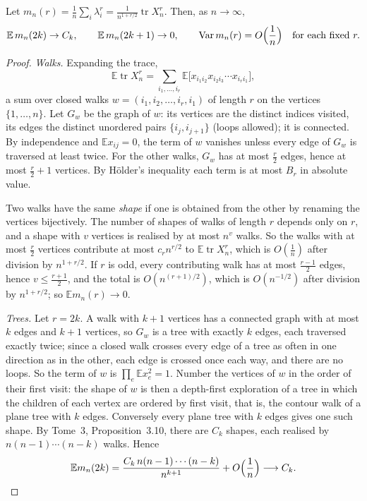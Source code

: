 \begin{lemma}\label{lem:walks}
Let $m_n(r)=\frac1n\sum_i\lambda_i^r=\frac1{n^{1+r/2}}\operatorname{tr}X_n^r$. Then, as $n\to\infty$,
\[
\mathbb E\,m_n(2k)\to C_k,\qquad\mathbb E\,m_n(2k+1)\to0,\qquad\operatorname{Var}m_n(r)=O\Bigl(\frac1n\Bigr)\quad\text{for each fixed }r.
\]
\end{lemma}
\begin{proof}
\emph{Walks.} Expanding the trace,
\[
\mathbb E\operatorname{tr}X_n^r=\sum_{i_1,\dots,i_r}\mathbb E\bigl[x_{i_1i_2}x_{i_2i_3}\cdots x_{i_ri_1}\bigr],
\]
a sum over closed walks $w=(i_1,i_2,\dots,i_r,i_1)$ of length $r$ on the vertices $\{1,\dots,n\}$. Let $G_w$ be the graph of $w$: its vertices are the
distinct indices visited, its edges the distinct unordered pairs $\{i_j,i_{j+1}\}$ (loops allowed); it is connected. By independence and $\mathbb Ex_{ij}=0$,
the term of $w$ vanishes unless every edge of $G_w$ is traversed at least twice. For the other walks, $G_w$ has at most $\frac r2$ edges, hence at most
$\frac r2+1$ vertices. By H\"older's inequality each term is at most $B_r$ in absolute value.

Two walks have the same \emph{shape} if one is obtained from the other by renaming the vertices bijectively. The number of shapes of walks of length $r$
depends only on $r$, and a shape with $v$ vertices is realised by at most $n^v$ walks. So the walks with at most $\frac r2$ vertices contribute at most
$c_rn^{r/2}$ to $\mathbb E\operatorname{tr}X_n^r$, which is $O(\frac1n)$ after division by $n^{1+r/2}$. If $r$ is odd, every contributing walk has at most $\frac{r-1}2$ edges, hence $v\le\frac{r+1}2$, and the
total is $O(n^{(r+1)/2})$, which is $O(n^{-1/2})$ after division by $n^{1+r/2}$; so $\mathbb Em_n(r)\to0$.

\emph{Trees.} Let $r=2k$. A walk with $k+1$ vertices has a connected graph with at most $k$ edges and $k+1$ vertices, so $G_w$ is a tree with exactly $k$ edges,
each traversed exactly twice; since a closed walk crosses every edge of a tree as often in one direction as in the other, each edge is crossed once
each way, and there are no loops. So the term of $w$ is $\prod_{e}\mathbb Ex_e^2=1$. Number the vertices of $w$ in the order of their first visit: the shape
of $w$ is then a depth-first exploration of a tree in which the children of each vertex are ordered by first visit, that is, the contour walk of a plane
tree with $k$ edges. Conversely every plane tree with $k$ edges gives one such shape. By Tome~3, Proposition~3.10, there are $C_k$ shapes, each realised
by $n(n-1)\cdots(n-k)$ walks. Hence
\[
\mathbb Em_n(2k)=\frac{C_k\,n(n-1)\cdots(n-k)}{n^{k+1}}+O\Bigl(\frac1n\Bigr)\longrightarrow C_k.
\]


\end{proof}
